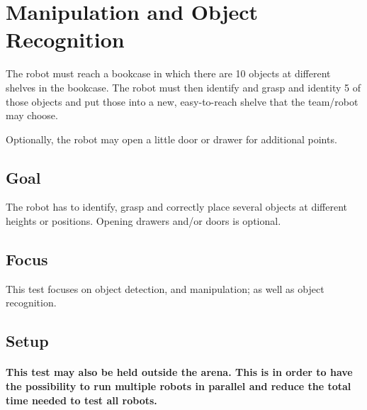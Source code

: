 \section{Manipulation and Object Recognition}

The robot must reach a bookcase in which there are 10 objects at different shelves in the bookcase. 
The robot must then identify and grasp and identity 5 of those objects and put those into a new, easy-to-reach shelve that the team/robot may choose.

Optionally, the robot may open a little door or drawer for additional points. 

\subsection{Goal}
The robot has to identify, grasp and correctly place several objects at different heights or positions.
Opening drawers and/or doors is optional.

\subsection{Focus}
This test focuses on object detection, and manipulation; as well as object recognition.

\subsection{Setup}
\paragraph{This test may also be held outside the arena.
  This is in order to have the possibility to run multiple robots in parallel and reduce the total time needed to test all robots.}


